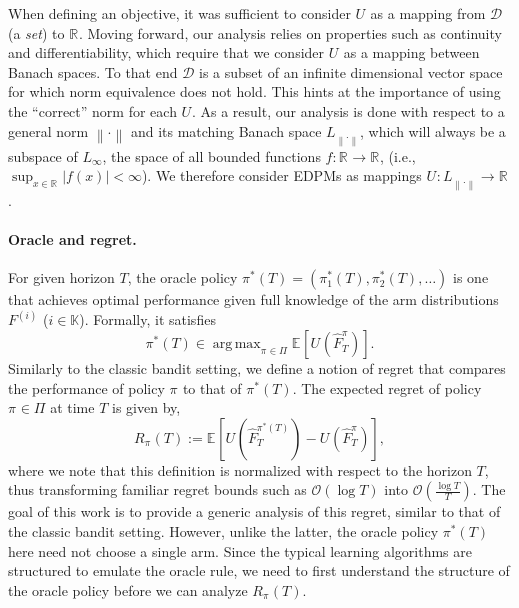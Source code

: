 \documentclass[final,12pt]{colt2018}
\newcommand{\prn}[1]{\left( #1 \right)}
\newcommand{\brk}[1]{\left\lbrack #1 \right\rbrack}
\newcommand{\abs}[1]{\left| #1 \right|}
\newcommand{\norm}[1]{\left\lVert #1 \right\rVert}
\newcommand{\EEBrk}[2][]{\mathbb{E}_{#1}\brk{#2}}
\newcommand{\RR}[1][]{\mathds{R}^{#1}}
\DeclareMathOperator*{\argmax}{arg\,max}
\newcommand{\EDRMabbrv}{EDPM}
\newcommand{\policiesSet}{\Pi}
\newcommand{\policy}[1][]{\pi^{#1}}
\newcommand{\policyAt}[2][]{\policy[#1]_{#2}}
\newcommand{\optPolicyTAt}[1]{\policyAt[*]{#1}\prn{T}}
\newcommand{\optPolicyT}{\policy[*]\prn{T}}
\newcommand{\RHat}[1][]{{U}^{#1}}
\newcommand{\RHatFunc}[2][]{\RHat[{#1}] \prn{#2}}
\newcommand{\FHatPi}[2][\policy]{\hat{F}_{#2}^{#1}}
\newcommand{\Fi}[1][i]{F^{\prn{{#1}}}}
\newcommand{\LInf}{L_{\infty}}
\newcommand{\baseFuncSpace}{\LInf}
\newcommand{\funcSpace}{L_{\norm{\cdot}}}
\newcommand{\DistSet}{\mathcal{D}}
\newcommand{\actionSet}{\mathds{K}}
\newcommand{\regret}[1][\policy]{R_{#1}\prn{T}}
\begin{document}
	When defining an objective, it was sufficient to consider $\RHat$ as a mapping from $\DistSet$ (a \textit{set}) to $\RR$. Moving forward, our analysis relies on properties such as continuity and differentiability, which require that we consider $\RHat$ as a mapping between Banach spaces. To that end $\DistSet$ is a subset of an infinite dimensional vector space for which norm equivalence does not hold. This hints at the importance of using the ``correct'' norm for each $\RHat$. As a result, our analysis is done with respect to a general norm $\norm{\cdot}$ and its matching Banach space $\funcSpace$, which will always be a subspace of $\baseFuncSpace$, the space of all bounded functions $f : \RR \to \RR$, (i.e., $\sup_{x \in \RR}\abs{f(x)}< \infty$). We therefore consider \EDRMabbrv s as mappings $\RHat : \funcSpace \to \RR$.
	
	
	
	
	\paragraph{Oracle and regret.} For given horizon $T$, the oracle policy $\optPolicyT = (\optPolicyTAt{1}, \optPolicyTAt{2}, \ldots)$ is one that achieves optimal performance given full knowledge of the arm distributions $\Fi$ ($i \in \actionSet$). Formally, it satisfies
	\begin{equation} \label{eq:oracleDef}
	\optPolicyT \in \argmax_{\policy \in \policiesSet} \EEBrk{\RHatFunc{\FHatPi{T}}}.
	\end{equation}
	Similarly to the classic bandit setting, we define a notion of regret that compares the performance of policy $\policy$ to that of $\optPolicyT$. The expected regret of policy $\policy \in \policiesSet$ at time $T$ is given by,
	\begin{equation} \label{eq:regretDef}
	\regret := \EEBrk{\RHatFunc{\FHatPi[\optPolicyT]{T}} - \RHatFunc{\FHatPi{T}}},
	\end{equation}
	where we note that this definition is normalized with respect to the horizon $T$, thus transforming familiar regret bounds such as $\mathcal{O}(\log T)$ into $\mathcal{O}(\frac{\log T}{T})$.
	The goal of this work is to provide a generic analysis of this regret, similar to that of the classic bandit setting. However, unlike the latter, the oracle policy $\optPolicyT$ here need not choose a single arm. Since the typical learning algorithms are structured to emulate the oracle rule, we need to first understand the structure of the oracle policy before we can analyze $\regret$.
	
\end{document}
